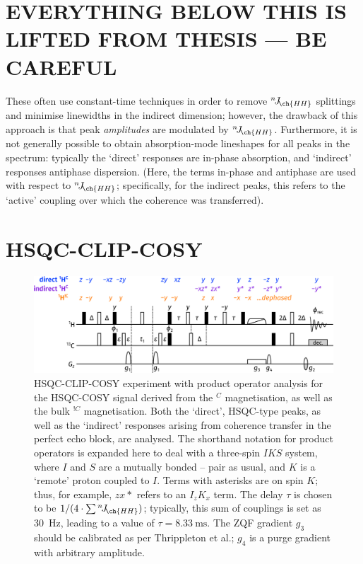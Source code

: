 \documentclass[a4paper,12pt]{article}
\newcommand{\proton}{\ch{^{1}H}}
\newcommand{\carbon}{\ch{^{13}C}}
\newcommand{\magn}[1]{\ch{^1H}$^{#1}$}
\newcommand{\magnnot}[1]{\ch{^1H}$^{!#1}$}
\newcommand{\nJ}[1]{{}^{n}\!J_{\!\ch{#1}}}
\begin{document}
\begin{refsection}
\section{EVERYTHING BELOW THIS IS LIFTED FROM THESIS --- BE CAREFUL}

These often use constant-time techniques in order to remove $\nJ{HH}$ splittings and minimise linewidths in the indirect dimension; however, the drawback of this approach is that peak \textit{amplitudes} are modulated by $\nJ{HH}$.
Furthermore, it is not generally possible to obtain absorption-mode lineshapes for all peaks in the spectrum: typically the `direct' responses are in-phase absorption, and `indirect' responses antiphase dispersion.
(Here, the terms in-phase and antiphase are used with respect to $\nJ{HH}$; specifically, for the indirect peaks, this refers to the `active' coupling over which the coherence was transferred).


\section{HSQC-CLIP-COSY}

\begin{figure}[!ht]
    \centering
    \includegraphics[]{clip_po.png}%
    \caption[HSQC-CLIP-COSY experiment]{
        HSQC-CLIP-COSY experiment with product operator analysis for the HSQC-COSY signal derived from the \magn{C} magnetisation, as well as the bulk \magnnot{C} magnetisation.
        Both the `direct', HSQC-type peaks, as well as the `indirect' responses arising from coherence transfer in the perfect echo block, are analysed.
        The shorthand notation for product operators is expanded here to deal with a three-spin $IKS$ system, where $I$ and $S$ are a mutually bonded \proton{}--\carbon{} pair as usual, and $K$ is a `remote' proton coupled to $I$.
        Terms with asterisks are on spin $K$; thus, for example, $zx*$ refers to an $I_zK_x$ term.
        The delay $\tau$ is chosen to be $1 / (4 \cdot \sum \nJ{HH})$; typically, this sum of couplings is set as \qty{30}{Hz}, leading to a value of $\tau = \qty{8.33}{\ms}$.
        The ZQF gradient $g_3$ should be calibrated as per Thrippleton et al.\autocite{Thrippleton2003ACIE}; $g_4$ is a purge gradient with arbitrary amplitude.
    }
    \label{fig:hsqcc_clip_po}
\end{figure}


\end{refsection}
\end{document}
